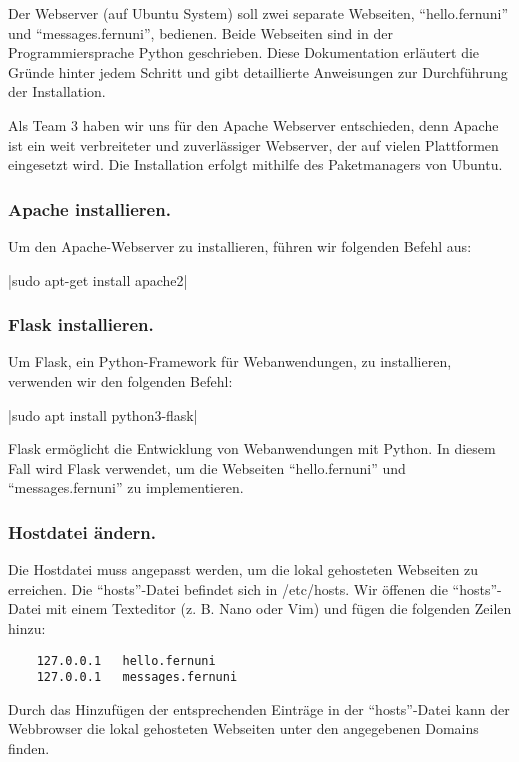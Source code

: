 Der Webserver (auf Ubuntu System) soll zwei separate Webseiten, \enquote{hello.fernuni} und \enquote{messages.fernuni}, bedienen. Beide Webseiten sind in der Programmiersprache Python geschrieben. Diese Dokumentation erläutert die Gründe hinter jedem Schritt und gibt detaillierte Anweisungen zur Durchführung der Installation.

Als Team 3 haben wir uns für den Apache Webserver entschieden, denn Apache ist ein weit verbreiteter und zuverlässiger Webserver, der auf vielen Plattformen eingesetzt wird. Die Installation erfolgt mithilfe des Paketmanagers von Ubuntu.

\subsubsection*{Apache installieren.}
Um den Apache-Webserver zu installieren, führen wir folgenden Befehl aus:

|sudo apt-get install apache2|

\subsubsection*{Flask installieren.}
Um Flask, ein Python-Framework für Webanwendungen, zu installieren, verwenden wir den folgenden Befehl:

|sudo apt install python3-flask|

Flask ermöglicht die Entwicklung von Webanwendungen mit Python. In diesem Fall wird Flask verwendet, um die Webseiten \enquote{hello.fernuni} und \enquote{messages.fernuni} zu implementieren.

\subsubsection*{Hostdatei ändern.}
Die Hostdatei muss angepasst werden, um die lokal gehosteten Webseiten zu erreichen. Die \enquote{hosts}-Datei befindet sich in /etc/hosts. Wir öffenen die \enquote{hosts}-Datei mit einem Texteditor (z. B. Nano oder Vim) und fügen die folgenden Zeilen hinzu:

\begin{verbatim}
    127.0.0.1 	hello.fernuni
    127.0.0.1 	messages.fernuni
\end{verbatim}

Durch das Hinzufügen der entsprechenden Einträge in der \enquote{hosts}-Datei kann der Webbrowser die lokal gehosteten Webseiten unter den angegebenen Domains finden.

